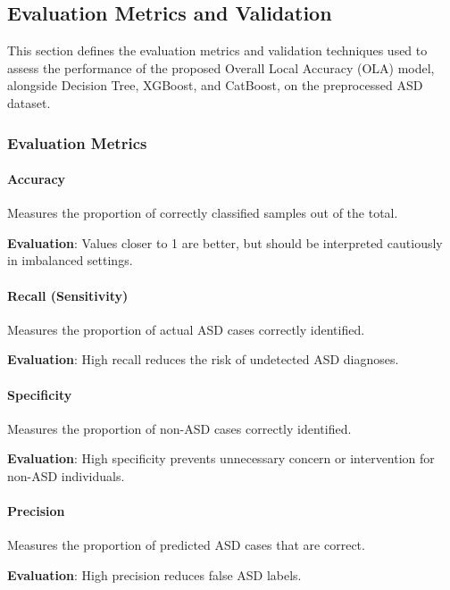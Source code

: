 \documentclass[conference]{IEEEtran}
\begin{document}
\subsection{Evaluation Metrics and Validation}

This section defines the evaluation metrics and validation techniques used to assess the performance of the proposed Overall Local Accuracy (OLA) model, alongside Decision Tree, XGBoost, and CatBoost, on the preprocessed ASD dataset.

\subsubsection{Evaluation Metrics}

\paragraph{Accuracy}

Measures the proportion of correctly classified samples out of the total.  

\textbf{Evaluation}: Values closer to 1 are better, but should be interpreted cautiously in imbalanced settings.

\paragraph{Recall (Sensitivity)} 

Measures the proportion of actual ASD cases correctly identified.  

\textbf{Evaluation}: High recall reduces the risk of undetected ASD diagnoses.

\paragraph{Specificity} 

Measures the proportion of non-ASD cases correctly identified. 

\textbf{Evaluation}: High specificity prevents unnecessary concern or intervention for non-ASD individuals.

\paragraph{Precision} 

Measures the proportion of predicted ASD cases that are correct.  

\textbf{Evaluation}: High precision reduces false ASD labels.
\end{document}
